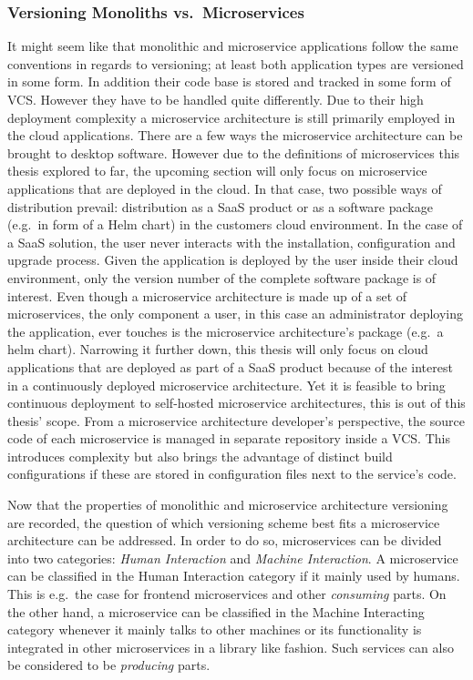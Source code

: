 \subsubsection{Versioning Monoliths vs.\ Microservices}%
\label{ssub:Versioning Monoliths_vs_Microservices}

It might seem like that monolithic and microservice applications
follow the same conventions in regards to versioning; at least both application
types are versioned in some form. In addition their code base is stored and
tracked in some form of \ac{VCS}. However they have to be handled quite
differently. Due to their high deployment complexity a microservice
architecture is still primarily employed in the cloud applications. There are a
few ways the microservice architecture can be brought to desktop software.
However due to the definitions of microservices this thesis explored to far,
the upcoming section will only focus on microservice applications that are
deployed in the cloud. In that case, two possible ways of distribution prevail:
distribution as a \ac{SaaS} product or as a software package (e.g.\ in form of
a Helm chart) in the customers cloud environment. In the case of a \ac{SaaS}
solution, the user never interacts with the installation, configuration and
upgrade process. Given the application is deployed by the user inside their
cloud environment, only the version number of the complete software package is
of interest. Even though a microservice architecture is made up of a set of
microservices, the only component a user, in this case an administrator
deploying the application, ever touches is the microservice architecture's
package (e.g.\ a helm chart). Narrowing it further down, this thesis will only
focus on cloud applications that are deployed as part of a \ac{SaaS} product
because of the interest in a continuously deployed microservice architecture.
Yet it is feasible to bring continuous deployment to self-hosted microservice
architectures, this is out of this thesis' scope. From a microservice
architecture developer's perspective, the source code of each microservice is
managed in separate repository inside a \ac{VCS}. This introduces complexity
but also brings the advantage of distinct build configurations if these are
stored in configuration files next to the service's code.

Now that the properties of monolithic and microservice architecture versioning
are recorded, the question of which versioning scheme best fits a microservice
architecture can be addressed. In order to do so, microservices can be divided
into two categories: \textit{Human Interaction} and \textit{Machine
Interaction}. A microservice can be classified in the Human Interaction
category if it mainly used by humans. This is e.g.\ the case for frontend
microservices and other \textit{consuming} parts. On the other hand, a
microservice can be classified in the Machine Interacting category whenever it
mainly talks to other machines or its functionality is integrated in other
microservices in a library like fashion. Such services can also be considered
to be \textit{producing} parts.

